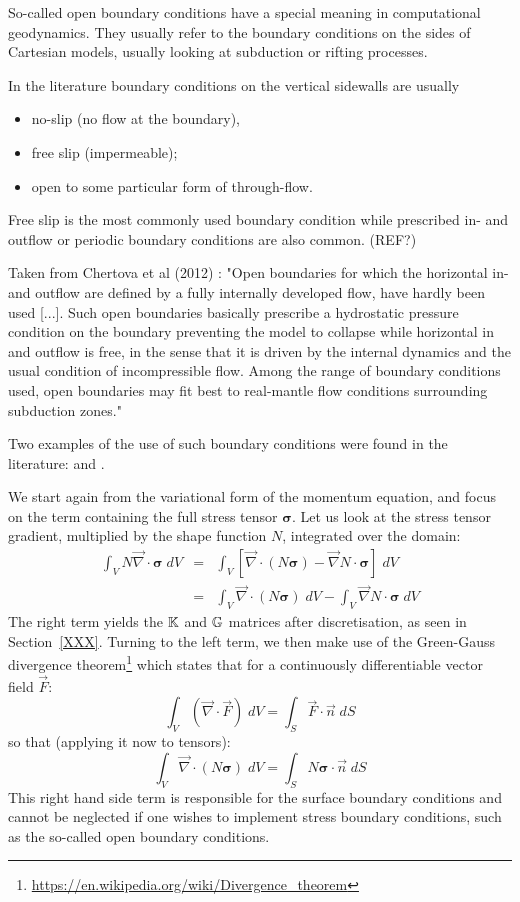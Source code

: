 So-called open boundary conditions have a special meaning in computational geodynamics. 
They usually refer to the boundary conditions on the sides of Cartesian models, 
usually looking at subduction or rifting processes. 

In the literature boundary conditions on the vertical sidewalls are usually 
\begin{itemize}
\item no-slip (no flow at the boundary), 
\item free slip (impermeable); 
\item open to some particular form of through-flow.
\end{itemize}

Free slip is the most commonly used boundary condition while prescribed in- and outflow 
or periodic boundary conditions are also common. (REF?)

Taken from Chertova et al (2012) \cite{chgv12}:
"Open boundaries for which the horizontal in- and outflow are defined by a fully 
internally developed flow, have hardly been used [...]. 
Such open boundaries basically prescribe a hydrostatic pressure condition on 
the boundary preventing the model to collapse while horizontal in and outflow is free, 
in the sense that it is driven by the internal dynamics and the usual condition of 
incompressible flow. 
Among the range of boundary conditions used, open boundaries may fit best to 
real-mantle flow conditions surrounding subduction zones." 

Two examples of the use of such boundary conditions were found in 
the literature: \cite{qusp10} and \cite{chgv12}.

We start again from the variational form of the momentum equation, and focus on the term containing 
the full stress tensor ${\bm \sigma}$. 
Let us look at the stress tensor gradient, multiplied by the shape function $N$, integrated over the domain:
\begin{eqnarray}
\int_V N {\vec \nabla}\cdot {\bm \sigma} \; dV 
&=&\int_V \left[ {\vec \nabla}\cdot(N {\bm \sigma}) -{\vec \nabla}N \cdot {\bm \sigma}\right] \; dV \nonumber\\
&=& \int_V  {\vec \nabla}\cdot(N {\bm \sigma})\;  dV -\int_V  {\vec \nabla}N \cdot {\bm \sigma} \; dV
\end{eqnarray}
The right term yields the ${\mathbb{K}}$ and ${\mathbb{G}}$ matrices after discretisation, as seen in Section~\ref{XXX}.
Turning to the left term, we then make use of the Green-Gauss divergence 
theorem\footnote{\url{https://en.wikipedia.org/wiki/Divergence_theorem}} which states that for 
a continuously differentiable vector field $\vec{F}$:
\[
\int_V ({\vec \nabla} \cdot {\vec F})\; dV = \int _S {\vec F}\cdot {\vec n} \; dS
\]
so that (applying it now to tensors):
\[
\int_V  {\vec \nabla}\cdot(N {\bm \sigma})\;  dV =\int_S  N {\bm \sigma} \cdot {\vec n} \;  dS
\]
This right hand side term is responsible for the surface 
boundary conditions and cannot be neglected if one 
wishes to implement stress boundary conditions, 
such as the so-called open boundary conditions. 

